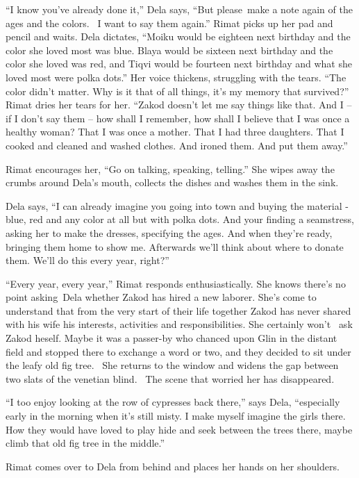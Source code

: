 \documentclass[twoside,11pt]{book}
\begin{document}
``I know you've already done it,'' Dela says, ``But please~make a note again of the ages and the colors. ~I
want to say them again.'' Rimat picks up her pad and pencil and waits. Dela dictates, ``Moiku
would be eighteen next birthday and the color she loved most was blue. Blaya would be sixteen next birthday and the
color she loved was red, and Tiqvi would be fourteen next birthday and what she loved most were polka
dots.'' Her voice thickens, struggling with the tears. ``The color didn't matter. Why is it
that of all things, it's my memory that survived?'' Rimat dries her tears for her. ``Zakod
doesn't let me say things like that. And I -- if I don't say them -- how shall I remember, how shall I believe that I
was once a healthy woman? That I was once a mother. That I had three daughters. That I cooked and cleaned and washed
clothes. And ironed them. And put them away.''

Rimat encourages her, ``Go on talking, speaking, telling.'' She wipes away the crumbs around
Dela's mouth, collects the dishes and washes them in the sink.

Dela says, ``I can already imagine you going into town and buying the material - blue, red and any color at
all but with polka dots. And your finding a seamstress, asking her to make the dresses, specifying the ages. And when
they're ready, bringing them home to show me. Afterwards we'll think about where to donate them. We'll do this every
year, right?''

``Every year, every year,'' Rimat responds enthusiastically. She knows there's no point
asking~Dela whether Zakod has hired a new laborer. She's come to understand that from the very start of their life
together Zakod has never shared with his wife his interests, activities and responsibilities{. }She
certainly won't {\ }ask Zakod heself. Maybe it was a passer-by who chanced upon Glin in the distant
field and stopped there to exchange a word or two, and they decided to sit under the{ }leafy old fig
tree. ~She returns to the window and widens the gap between two slats of the venetian blind. ~The scene that worried
her has disappeared.

``I too enjoy looking at the row of cypresses back there,'' says Dela,
``especially early in the morning when it's still misty. I make myself imagine the girls there. How they
would have loved to play hide and seek between the trees there, maybe climb that old fig tree in the
middle.''

Rimat comes over to Dela from behind and places her hands on her shoulders.
\end{document}
